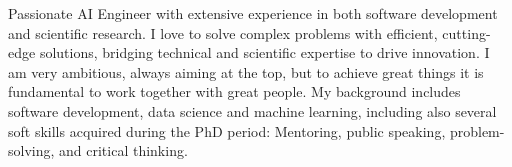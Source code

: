 Passionate AI Engineer with extensive experience in both software development and scientific research. I love to solve complex problems with efficient, cutting-edge solutions, bridging technical and scientific expertise to drive innovation.
I am very ambitious, always aiming at the top, but to achieve great things it is fundamental to work together with great people.
My background includes software development, data science and machine learning, including also several soft skills acquired during the PhD period: Mentoring, public speaking, problem-solving, and critical thinking.